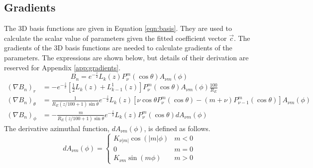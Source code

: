 \documentclass[12pt,letterpaper]{article}
\begin{document}
  \subsection{Gradients}
  The 3D basis functions are given in Equation \ref{eqn:basis}.  They are used to calculate the scalar value of parameters given the fitted coefficient vector \(\vec{c}\).  The gradients of the 3D basis functions are needed to calculate gradients of the parameters.  The expressions are shown below, but details of their derivation are reserved for Appendix \ref{app:gradients}.
  \begin{equation}
    B_n = e^{-\frac{z}{2}}L_k(z)P_\nu^m(\cos\theta)A_{\nu m}(\phi)
  \end{equation}
  \begin{align}
    (\nabla B_n)_r &= -e^{-\frac{z}{2}}\left[\frac{1}{2}L_k(z)+L_{k-1}^1(z)\right]P_\nu^m(\cos\theta)A_{\nu m}(\phi)\frac{100}{R_E} \\
    (\nabla B_n)_\theta &= \frac{1}{R_E(z/100+1)\sin\theta}e^{-\frac{z}{2}}L_k(z)\left[\nu\cos\theta P_\nu^m(\cos\theta)-(m+\nu)P_{\nu-1}^m(\cos\theta)\right]A_{\nu m}(\phi) \\
    (\nabla B_n)_\phi &= -\frac{m}{R_E(z/100+1)\sin\theta}e^{-\frac{z}{2}}L_k(z)P_\nu^m(\cos\theta)dA_{\nu m}(\phi)
  \end{align}
  The derivative azimuthal function, \(dA_{\nu m}(\phi)\), is defined as follows.
  \begin{equation}
    \label{eqn:dA}
    dA_{\nu m}(\phi) = \begin{cases}
                        K_{\nu |m|}\cos(|m|\phi) & m < 0 \\
                        0 & m = 0 \\
                        K_{\nu m}\sin(m\phi) & m > 0
                      \end{cases}    
  \end{equation}
\end{document}
